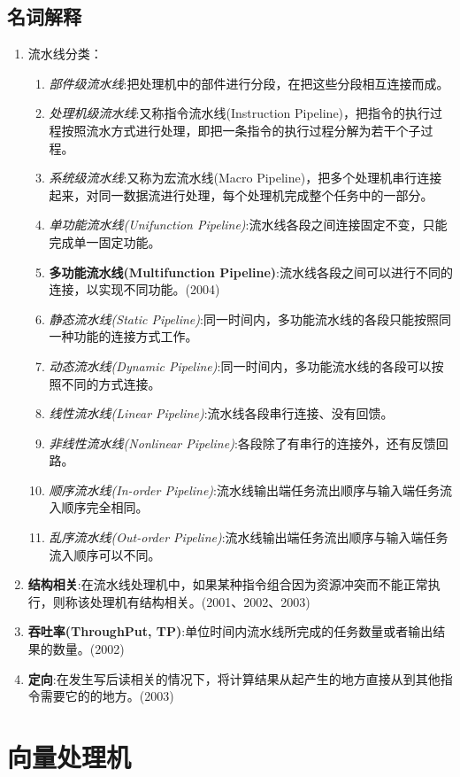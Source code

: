 \documentclass[a4paper]{ctexart}
\begin{document}
\subsection{名词解释}
\begin{enumerate}
  \item 流水线分类：
  \begin{enumerate}
    \item \emph{部件级流水线}:把处理机中的部件进行分段，在把这些分段相互连接而成。
    \item \emph{处理机级流水线}:又称指令流水线(Instruction Pipeline)，把指令的执行过程按照流水方式进行处理，即把一条指令的执行过程分解为若干个子过程。
    \item \emph{系统级流水线}:又称为宏流水线(Macro Pipeline)，把多个处理机串行连接起来，对同一数据流进行处理，每个处理机完成整个任务中的一部分。
    \item \emph{单功能流水线(Unifunction Pipeline)}:流水线各段之间连接固定不变，只能完成单一固定功能。
    \item \textbf{多功能流水线(Multifunction Pipeline)}:流水线各段之间可以进行不同的连接，以实现不同功能。(2004)
    \item \emph{静态流水线(Static Pipeline)}:同一时间内，多功能流水线的各段只能按照同一种功能的连接方式工作。
    \item \emph{动态流水线(Dynamic Pipeline)}:同一时间内，多功能流水线的各段可以按照不同的方式连接。
    \item \emph{线性流水线(Linear Pipeline)}:流水线各段串行连接、没有回馈。
    \item \emph{非线性流水线(Nonlinear Pipeline)}:各段除了有串行的连接外，还有反馈回路。
    \item \emph{顺序流水线(In-order Pipeline)}:流水线输出端任务流出顺序与输入端任务流入顺序完全相同。
    \item \emph{乱序流水线(Out-order Pipeline)}:流水线输出端任务流出顺序与输入端任务流入顺序可以不同。
  \end{enumerate}
  \item \textbf{结构相关}:在流水线处理机中，如果某种指令组合因为资源冲突而不能正常执行，则称该处理机有结构相关。(2001、2002、2003)
  \item \textbf{吞吐率(ThroughPut, TP)}:单位时间内流水线所完成的任务数量或者输出结果的数量。(2002)
  \item \textbf{定向}:在发生写后读相关的情况下，将计算结果从起产生的地方直接从到其他指令需要它的的地方。(2003)
\end{enumerate}


\section{向量处理机}
\end{document}
